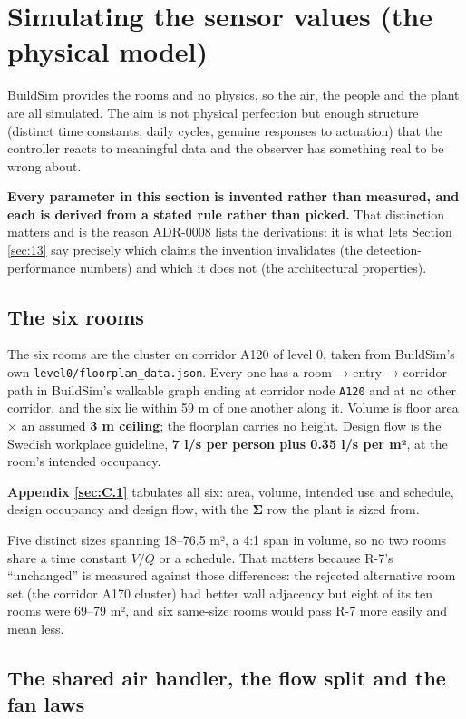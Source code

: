 \section{Simulating the sensor values (the physical model)}\label{sec:6}

BuildSim provides the rooms and no physics, so the air, the people and the plant are all
simulated. The aim is not physical perfection but enough structure (distinct time constants,
daily cycles, genuine responses to actuation) that the controller reacts to meaningful data and
the observer has something real to be wrong about.

\textbf{Every parameter in this section is invented rather than measured, and each is derived from
a stated rule rather than picked.} That distinction matters and is the reason ADR-0008 lists the
derivations: it is what lets Section \ref{sec:13} say precisely which claims the invention invalidates
(the detection-performance numbers) and which it does not (the architectural properties).

\subsection{The six rooms}\label{sec:6.1}

The six rooms are the cluster on corridor A120 of level 0, taken from BuildSim's own
\texttt{level0/\allowbreak floorplan\_data.json}. Every one has a
room → entry → corridor path in BuildSim's walkable graph ending at corridor node \texttt{A120}
and at no other corridor, and the six lie within 59 m of one another along it. Volume is floor area
× an assumed \textbf{3 m ceiling}; the floorplan carries no height. Design flow is the Swedish
workplace guideline, \textbf{7 l/s per person plus 0.35 l/s per m²}, at the room's intended
occupancy.

\textbf{Appendix \ref{sec:C.1}} tabulates all six: area, volume, intended use and schedule, design
occupancy and design flow, with the \textbf{Σ} row the plant is sized from.

Five distinct sizes spanning 18–76.5 m², a 4:1 span in volume, so no two rooms share a time
constant $V/Q$ or a schedule. That matters because R-7's ``unchanged'' is measured against those
differences: the rejected alternative room set (the corridor A170 cluster) had better wall
adjacency but eight of its ten rooms were 69–79 m², and six same-size rooms would pass R-7 more
easily and mean less.

\subsection{The shared air handler, the flow split and the fan laws}\label{sec:6.2}

